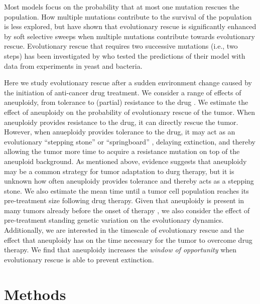 \documentclass[12pt]{extarticle}
\begin{document}
Most models focus on the probability that at most one mutation rescues the population. How multiple mutations contribute to the survival of the population is less explored, but \citet{wilson2017soft} have shown that evolutionary rescue is significantly enhanced by soft selective sweeps when multiple mutations contribute towards evolutionary rescue.  Evolutionary rescue that requires two successive mutations (i.e., two steps) has been investigated by \citet{martin2013probability} who tested the predictions of their model with data from experiments in yeast and bacteria.

Here we study evolutionary rescue after a sudden environment change caused by the initiation of anti-cancer drug treatment. 
We consider a range of effects of aneuploidy, from tolerance to (partial) resistance to the drug \citep{brauner2016distinguishing}.
We estimate the effect of aneuploidy on the probability of evolutionary rescue of the tumor. When aneuploidy provides resistance to the drug, it can directly rescue the tumor. However, when anueploidy provides tolerance to the drug, it may act as an evolutionary ``stepping stone'' or ``springboard'' \citep{Yona2015,martin2013probability,osmond_genetic_2020}, delaying extinction, and thereby allowing the tumor more time to acquire a resistance mutation on top of the aneuploid background. 
As mentioned above, evidence suggests that aneuploidy may be a common strategy for tumor adaptation to durg therapy, but it is unknown how often aneuploidy provides tolerance and thereby acts as a stepping stone.
We also estimate the mean time until a tumor cell population reaches its pre-treatment size following drug therapy. 
Given that aneuploidy is present in many tumors already before the onset of therapy \citep{lukow2021chromosomal,ben2020context}, we also consider the effect of pre-treatment standing genetic variation on the evolutionary dynamics. Additionally, we are interested in the timescale of evolutionary rescue and the effect that aneuploidy has on the time necessary for the tumor to overcome drug therapy. We find that aneuploidy increases the \emph{window of opportunity} when evolutionary rescue is able to prevent extinction.

\section*{Methods}
\end{document}
